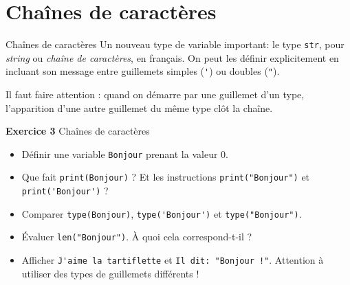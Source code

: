 \documentclass[10pt]{beamer}
\begin{document}
\section{Chaînes de caractères}

\begin{frame}[fragile]{Chaînes de caractères}
Un nouveau type de variable important: le type \verb|str|, pour \textit{string} ou \textit{chaîne de caractères}, en français. On peut les définir explicitement en incluant son message entre guillemets simples (\verb|'|) ou doubles (\verb|"|).\pause

Il faut faire attention : quand on démarre par une guillemet d'un type, l'apparition d'une autre guillemet du même type clôt la chaîne.\pause

	\begin{block}{\textbf{Exercice 3} Chaînes de caractères}
	
	\begin{itemize}[<+->]
	\item Définir une variable \verb|Bonjour| prenant la valeur $0$.
	
	\item Que fait \verb|print(Bonjour)| ? Et les instructions \verb|print("Bonjour")| et \verb|print('Bonjour')| ?
	
	\item Comparer \verb|type(Bonjour)|, \verb|type('Bonjour')| et \verb|type("Bonjour")|.
	
	\item Évaluer \verb|len("Bonjour")|. À quoi cela correspond-t-il ?
    
    \item Afficher \verb|J'aime la tartiflette| et  \verb|Il dit: "Bonjour !"|. Attention à utiliser des types de guillemets différents !
    \end{itemize}
\end{block}

\end{frame}
\end{document}
